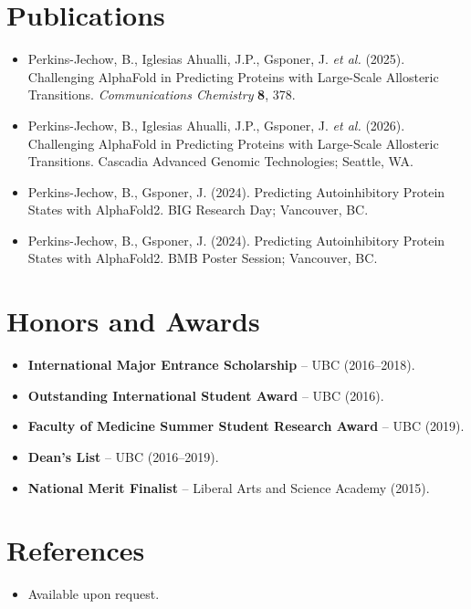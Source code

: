 \documentclass[11pt,a4paper,sans]{moderncv}
\begin{document}
\section{Publications}
\vspace{1pt}
\begin{itemize}
\item Perkins-Jechow, B., Iglesias Ahualli, J.P., Gsponer, J. \textit{et al.} (2025). Challenging AlphaFold in Predicting Proteins with Large-Scale Allosteric Transitions. \textit{Communications Chemistry} \textbf{8}, 378.
\item Perkins-Jechow, B., Iglesias Ahualli, J.P., Gsponer, J. \textit{et al.} (2026). Challenging AlphaFold in Predicting Proteins with Large-Scale Allosteric Transitions. Cascadia Advanced Genomic Technologies; Seattle, WA.
\item Perkins-Jechow, B., Gsponer, J. (2024). Predicting Autoinhibitory Protein States with AlphaFold2. BIG Research Day; Vancouver, BC.
\item Perkins-Jechow, B., Gsponer, J. (2024). Predicting Autoinhibitory Protein States with AlphaFold2. BMB Poster Session; Vancouver, BC.
\end{itemize}


\section{Honors and Awards}
\vspace{1pt}
\begin{itemize}
\item{\textbf{International Major Entrance Scholarship} -- UBC (2016--2018).}
\item{\textbf{Outstanding International Student Award} -- UBC (2016).}
\item{\textbf{Faculty of Medicine Summer Student Research Award} -- UBC (2019).}
\item{\textbf{Dean's List} -- UBC (2016--2019).}
\item{\textbf{National Merit Finalist} -- Liberal Arts and Science Academy (2015).}
\end{itemize}


\section{References}
\vspace{1pt}
\begin{itemize}
\item{Available upon request.}
\end{itemize}
\end{document}
